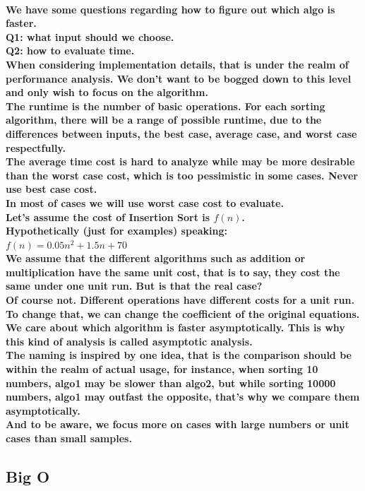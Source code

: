 \documentclass{article}
\begin{document}
\paragraph{We have some questions regarding how to figure out which algo is faster.\\
Q1: what input should we choose.\\
Q2: how to evaluate time.\\
When considering implementation details, that is under the realm of performance analysis. We don't want to be bogged down to this level and only wish to focus on the algorithm.\\
The runtime is the number of basic operations. For each sorting algorithm, there will be a range of possible runtime, due to the differences between inputs, the best case, average case, and worst case respectfully.\\
The average time cost is hard to analyze while may be more desirable than the worst case cost, which is too pessimistic in some cases. Never use best case cost.\\
In most of cases we will use worst case cost to evaluate.\\
Let's assume the cost of Insertion Sort is $f(n)$.\\
Hypothetically (just for examples) speaking:\\
$ f(n) = 0.05n^2 + 1.5n +70 $\\
We assume that the different algorithms such as addition or multiplication have the same unit cost, that is to say, they cost the same under one unit run. But is that the real case?\\
Of course not. Different operations have different costs for a unit run. To change that, we can change the coefficient of the original equations.\\
We care about which algorithm is faster asymptotically. This is why this kind of analysis is called asymptotic analysis.\\
The naming is inspired by one idea, that is the comparison should be within the realm of actual usage, for instance, when sorting 10 numbers, algo1 may be slower than algo2, but while sorting 10000 numbers, algo1 may outfast the opposite, that's why we compare them asymptotically.\\
And to be aware, we focus more on cases with large numbers or unit cases than small samples.}

\subsection{Big O}
\end{document}
